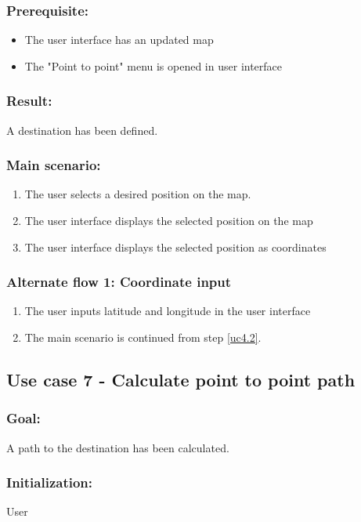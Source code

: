 \subsubsection*{Prerequisite:}
\begin{itemize}
	\item The user interface has an updated map
	\item The "Point to point" menu is opened in user interface
\end{itemize}

\subsubsection*{Result:}
A destination has been defined.

\subsubsection*{Main scenario:}
\begin{enumerate}
	\item The user selects a desired position on the map.
	\item \label{uc4.2} The user interface displays the selected position on the map
	\item The user interface displays the selected position as coordinates
\end{enumerate}	

\subsubsection*{Alternate flow 1: Coordinate input}
	\begin{enumerate}
		\item The user inputs latitude and longitude in the user interface
		\item The main scenario is continued from step \ref{uc4.2}.
	\end{enumerate}


\subsection{Use case 7 - Calculate point to point path}
\subsubsection*{Goal:}
A path to the destination has been calculated.

\subsubsection*{Initialization:}
User

